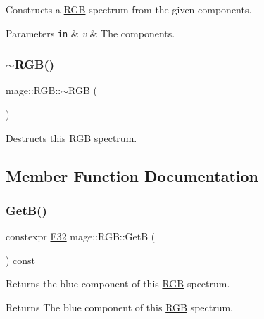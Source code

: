 Constructs a \mbox{\hyperlink{structmage_1_1_r_g_b}{R\+GB}} spectrum from the given components.


\begin{DoxyParams}[1]{Parameters}
\mbox{\tt in}  & {\em v} & The components. \\
\hline
\end{DoxyParams}
\mbox{\label{structmage_1_1_r_g_b_a2c01428e1da4ec354b85320a905beab3}} 
\subsubsection{\texorpdfstring{$\sim$\+R\+G\+B()}{~RGB()}}
{\footnotesize\ttfamily mage\+::\+R\+G\+B\+::$\sim$\+R\+GB (\begin{DoxyParamCaption}{ }\end{DoxyParamCaption})\hspace{0.3cm}{\ttfamily [default]}}

Destructs this \mbox{\hyperlink{structmage_1_1_r_g_b}{R\+GB}} spectrum. 

\subsection{Member Function Documentation}
\mbox{\label{structmage_1_1_r_g_b_a5a48ef39436290969ed01021bdbb687d}} 
\subsubsection{\texorpdfstring{Get\+B()}{GetB()}}
{\footnotesize\ttfamily constexpr \mbox{\hyperlink{namespacemage_aa97e833b45f06d60a0a9c4fc22ae02c0}{F32}} mage\+::\+R\+G\+B\+::\+GetB (\begin{DoxyParamCaption}{ }\end{DoxyParamCaption}) const\hspace{0.3cm}{\ttfamily [noexcept]}}

Returns the blue component of this \mbox{\hyperlink{structmage_1_1_r_g_b}{R\+GB}} spectrum.

\begin{DoxyReturn}{Returns}
The blue component of this \mbox{\hyperlink{structmage_1_1_r_g_b}{R\+GB}} spectrum. 
\end{DoxyReturn}
\mbox{\label{structmage_1_1_r_g_b_a997a18a9af34e5796d18974762574faf}} 
